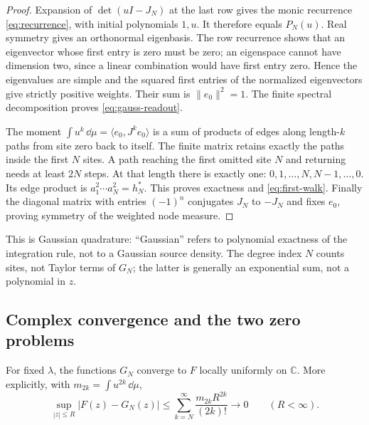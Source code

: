 \begin{proof}
Expansion of \(\det(uI-J_N)\) at the last row gives the monic
recurrence \eqref{eq:recurrence}, with initial polynomials \(1,u\).
It therefore equals \(P_N(u)\). Real symmetry gives an orthonormal
eigenbasis. The row recurrence shows that an eigenvector whose first
entry is zero must be zero; an eigenspace cannot have dimension two,
since a linear combination would have first entry zero. Hence the
eigenvalues are simple and the squared first entries of the normalized
eigenvectors give strictly positive weights. Their sum is
\(\|e_0\|^2=1\). The finite spectral decomposition proves
\eqref{eq:gauss-readout}.

The moment \(\int u^k\,\dd\mu=\langle e_0,J^ke_0\rangle\)
is a sum of products of edges along length-\(k\) paths from site zero
back to itself. The finite matrix retains exactly the paths inside
the first \(N\) sites. A path reaching the first omitted site \(N\)
and returning needs at least \(2N\) steps. At that length there is
exactly one: \(0,1,\ldots,N,N-1,\ldots,0\). Its edge product is
\(a_1^2\cdots a_N^2=h_N^*\). This proves exactness and
\eqref{eq:first-walk}. Finally the diagonal matrix with entries
\((-1)^n\) conjugates \(J_N\) to \(-J_N\) and fixes \(e_0\),
proving symmetry of the weighted node measure.
\end{proof}

This is Gaussian quadrature: ``Gaussian'' refers to polynomial
exactness of the integration rule, not to a Gaussian source density.
The degree index \(N\) counts sites, not Taylor terms of \(G_N\);
the latter is generally an exponential sum, not a polynomial in \(z\).

\subsection{Complex convergence and the two zero problems}

\begin{proposition}
\label{prop:compact}
For fixed \(\lambda\), the functions \(G_N\) converge to \(F\)
locally uniformly on \(\mathbb C\). More explicitly, with
\(m_{2k}=\int u^{2k}\,\dd\mu\),
\begin{equation}
 \sup_{|z|\le R}|F(z)-G_N(z)|
 \le\sum_{k=N}^{\infty}\frac{m_{2k}R^{2k}}{(2k)!}
 \longrightarrow0\qquad(R<\infty).
 \label{eq:compact-bound}
\end{equation}
\end{proposition}

